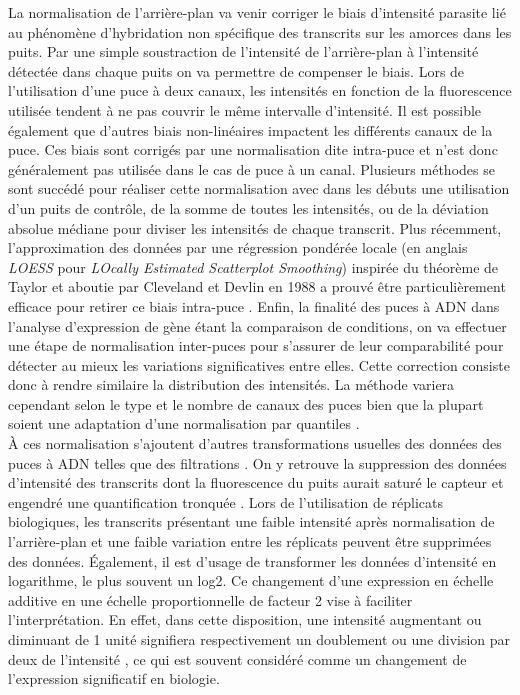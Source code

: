 La normalisation de l'arrière-plan va venir corriger le biais d'intensité parasite lié au phénomène d'hybridation non spécifique des transcrits sur les amorces dans les puits. Par une simple soustraction de l'intensité de l'arrière-plan à l'intensité détectée dans chaque puits on va permettre de compenser le biais. Lors de l'utilisation d'une puce à deux canaux, les intensités en fonction de la fluorescence utilisée tendent à ne pas couvrir le même intervalle d'intensité. Il est possible également que d'autres biais non-linéaires impactent les différents canaux de la puce. Ces biais sont corrigés par une normalisation dite intra-puce et n'est donc généralement pas utilisée dans le cas de puce à un canal. Plusieurs méthodes se sont succédé pour réaliser cette normalisation avec dans les débuts une utilisation d'un puits de contrôle, de la somme de toutes les intensités, ou de la déviation absolue médiane pour diviser les intensités de chaque transcrit. Plus récemment, l'approximation des données par une régression pondérée locale (en anglais \textit{LOESS} pour \textit{LOcally Estimated Scatterplot Smoothing}) inspirée du théorème de Taylor et aboutie par Cleveland et Devlin en 1988 \cite{Cleveland1988Sep} a prouvé être particulièrement efficace pour retirer ce biais intra-puce \cite{Smyth2003Dec}. Enfin, la finalité des puces à \acrshort{ADN} dans l'analyse d'expression de gène étant la comparaison de \glspl{condition}, on va effectuer une étape de normalisation inter-puces pour s'assurer de leur comparabilité pour détecter au mieux les variations significatives entre elles. Cette correction consiste donc à rendre similaire la distribution des intensités. La méthode variera cependant selon le type et le nombre de canaux des puces bien que la plupart soient une adaptation d'une normalisation par quantiles \cite{Ritchie2015Apr}. \\


À ces normalisation s'ajoutent d'autres transformations usuelles des données des puces à \acrshort{ADN} telles que des filtrations \cite{Quackenbush2002Dec}. On y retrouve la suppression des données d'intensité des transcrits dont la fluorescence du puits aurait saturé le capteur et engendré une quantification tronquée \cite{Wilkes2007Apr}. Lors de l'utilisation de réplicats biologiques, les transcrits présentant une faible intensité après normalisation de l'arrière-plan et une faible variation entre les réplicats peuvent être supprimées des données. Également, il est d'usage de transformer les données d'intensité en logarithme, le plus souvent un log2. Ce changement d'une expression en échelle additive en une échelle proportionnelle de facteur 2 vise à faciliter l'interprétation. En effet, dans cette disposition, une intensité augmentant ou diminuant de 1 unité signifiera respectivement un doublement ou une division par deux de l'intensité \cite{Smyth2003Dec}, ce qui est souvent considéré comme un changement de l'expression significatif en biologie. 

